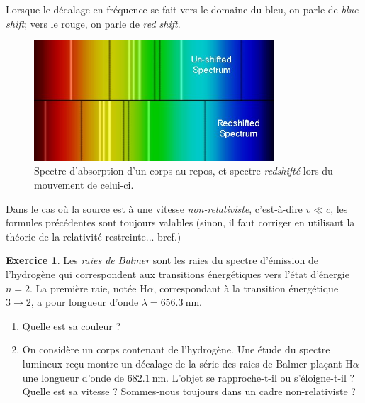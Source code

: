 \documentclass{article}
\theoremstyle{definition}
\newtheorem{exo}{Exercice}
\begin{document}
Lorsque le décalage en fréquence se fait vers le domaine du bleu, on parle de \textit{blue shift}; vers le rouge, on parle de \textit{red shift}.

\begin{figure}[h]
	\centering
	\includegraphics[width=0.8\textwidth]{redshift1.jpg}
	\caption{Spectre d'absorption d'un corps au repos, et spectre \textit{redshifté} lors du mouvement de celui-ci.}
\end{figure}

Dans le cas où la source est à une vitesse \textit{non-relativiste}, c'est-à-dire $v\ll c$, les formules précédentes sont toujours valables (sinon, il faut corriger en utilisant la théorie de la relativité restreinte... bref.)

\begin{exo}
	Les \textit{raies de Balmer} sont les raies du spectre d'émission de l'hydrogène qui correspondent aux transitions énergétiques vers l'état d'énergie $n=2$. La première raie, notée H$\alpha$, correspondant à la transition énergétique $3\to 2$, a pour longueur d'onde $\lambda = \SI{656.3}{\nano\meter}$.
	
	\begin{enumerate}
		\item Quelle est sa couleur ?
		\item On considère un corps contenant de l'hydrogène. Une étude du spectre lumineux reçu montre un décalage de la série des raies de Balmer plaçant H$\alpha$ une longueur d'onde de $\SI{682.1}{\nano\meter} $. L'objet se rapproche-t-il ou s'éloigne-t-il ? Quelle est sa vitesse ? Sommes-nous toujours dans un cadre non-relativiste ?
	\end{enumerate}
\end{exo}
\end{document}
